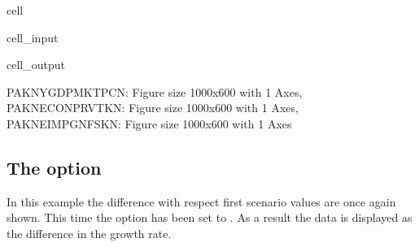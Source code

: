 \documentclass[letterpaper,10pt,english]{jupyterBook}
\begin{document}
\begin{sphinxuseclass}{cell}\begin{sphinxVerbatimInput}

\begin{sphinxuseclass}{cell_input}
\begin{sphinxVerbatim}[commandchars=\\\{\}]
  
\end{sphinxVerbatim}

\end{sphinxuseclass}\end{sphinxVerbatimInput}
\begin{sphinxVerbatimOutput}

\begin{sphinxuseclass}{cell_output}
\begin{sphinxVerbatim}[commandchars=\\\{\}]
\PYGZob{}\PYGZsq{}PAKNYGDPMKTPCN\PYGZsq{}: \PYGZlt{}Figure size 1000x600 with 1 Axes\PYGZgt{},
 \PYGZsq{}PAKNECONPRVTKN\PYGZsq{}: \PYGZlt{}Figure size 1000x600 with 1 Axes\PYGZgt{},
 \PYGZsq{}PAKNEIMPGNFSKN\PYGZsq{}: \PYGZlt{}Figure size 1000x600 with 1 Axes\PYGZgt{}\PYGZcb{}
\end{sphinxVerbatim}

\end{sphinxuseclass}\end{sphinxVerbatimOutput}

\end{sphinxuseclass}

\subsection{The  option}
\label{\detokenize{content/06_WBModels/ScenarioAnalysis:the-showtype-option}}
\sphinxAtStartPar
In this example the difference with respect first  scenario  values are once again shown. This time the  option has been set to .  As a result the data is displayed as the  difference in the growth rate.
\end{document}
